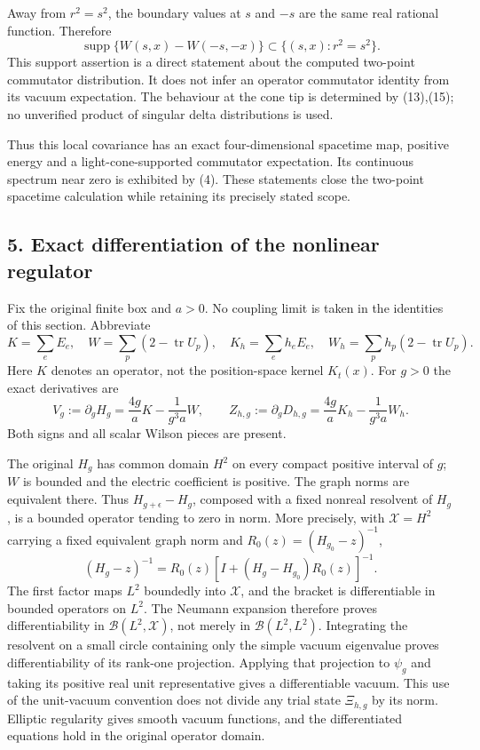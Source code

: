 \documentclass[
  11pt,
]{article}
\begin{document}
Away from \(r^2=s^2\), the boundary values at \(s\) and \(-s\) are the
same real rational function. Therefore \[
 \operatorname{supp}\{W(s,x)-W(-s,-x)\}
                         \subset\{(s,x):r^2=s^2\}.
 \tag{16}
\] This support assertion is a direct statement about the computed
two-point commutator distribution. It does not infer an operator
commutator identity from its vacuum expectation. The behaviour at the
cone tip is determined by (13),(15); no unverified product of singular
delta distributions is used.

Thus this local covariance has an exact four-dimensional spacetime map,
positive energy and a light-cone-supported commutator expectation. Its
continuous spectrum near zero is exhibited by (4). These statements
close the two-point spacetime calculation while retaining its precisely
stated scope.

\subsection{5. Exact differentiation of the nonlinear
regulator}\label{weak-coupling-part-11-exact-differentiation-of-the-nonlinear-regulator}

Fix the original finite box and \(a>0\). No coupling limit is taken in
the identities of this section. Abbreviate \[
 K=\sum_eE_e,\quad W=\sum_p(2-\operatorname{tr}U_p),\quad
 K_h=\sum_eh_eE_e,\quad
 W_h=\sum_ph_p(2-\operatorname{tr}U_p).
 \tag{17}
\] Here \(K\) denotes an operator, not the position-space kernel
\(K_t(x)\). For \(g>0\) the exact derivatives are \[
 V_g:=\partial_gH_g=\frac{4g}{a}K-\frac1{g^3a}W,\qquad
 Z_{h,g}:=\partial_gD_{h,g}
                  =\frac{4g}{a}K_h-\frac1{g^3a}W_h.
 \tag{18}
\] Both signs and all scalar Wilson pieces are present.

The original \(H_g\) has common domain \(H^2\) on every compact positive
interval of \(g\); \(W\) is bounded and the electric coefficient is
positive. The graph norms are equivalent there. Thus
\(H_{g+\epsilon}-H_g\), composed with a fixed nonreal resolvent of
\(H_g\), is a bounded operator tending to zero in norm. More precisely,
with \(\mathscr X=H^2\) carrying a fixed equivalent graph norm and
\(R_0(z)=(H_{g_0}-z)^{-1}\), \[
 (H_g-z)^{-1}
 =R_0(z)[I+(H_g-H_{g_0})R_0(z)]^{-1}.
\] The first factor maps \(L^2\) boundedly into \(\mathscr X\), and the
bracket is differentiable in bounded operators on \(L^2\). The Neumann
expansion therefore proves differentiability in
\(\mathcal B(L^2,\mathscr X)\), not merely in \(\mathcal B(L^2,L^2)\).
Integrating the resolvent on a small circle containing only the simple
vacuum eigenvalue proves differentiability of its rank-one projection.
Applying that projection to \(\psi_g\) and taking its positive real unit
representative gives a differentiable vacuum. This use of the
unit-vacuum convention does not divide any trial state \(\Xi_{h,g}\) by
its norm. Elliptic regularity gives smooth vacuum functions, and the
differentiated equations hold in the original operator domain.
\end{document}
